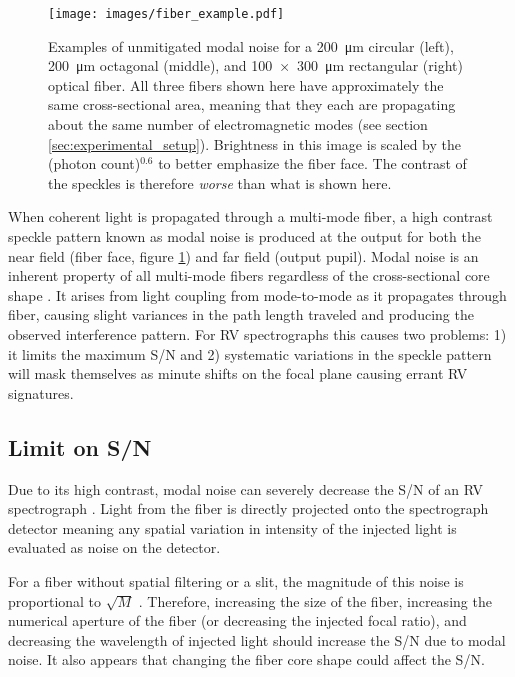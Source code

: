 \documentclass[twocolumn]{emulateapj}
\begin{document}
\begin{figure}
\centering
	\texttt{[image: images/fiber\_example.pdf]}
	\caption{Examples of unmitigated modal noise for a \SI{200}{\micro\meter} circular (left), \SI{200}{\micro\meter} octagonal (middle), and \SI{100x300}{\micro\meter} rectangular (right) optical fiber. All three fibers shown here have approximately the same cross-sectional area, meaning that they each are propagating about the same number of electromagnetic modes (see section \ref{sec:experimental_setup}). Brightness in this image is scaled by the (photon count)$^{0.6}$ to better emphasize the fiber face. The contrast of the speckles is therefore \textit{worse} than what is shown here.}
\label{fig:fiber_example}
\end{figure}

When coherent light is propagated through a multi-mode fiber, a high contrast speckle pattern known as modal noise is produced at the output for both the near field (fiber face, figure \ref{fig:fiber_example}) and far field (output pupil). Modal noise is an inherent property of all multi-mode fibers regardless of the cross-sectional core shape \citep{Sablowski2015}. It arises from light coupling from mode-to-mode as it propagates through fiber, causing slight variances in the path length traveled and producing the observed interference pattern. For RV spectrographs this causes two problems: 1) it limits the maximum S/N and 2) systematic variations in the speckle pattern will mask themselves as minute shifts on the focal plane causing errant RV signatures.

\subsection{Limit on S/N}

Due to its high contrast, modal noise can severely decrease the S/N of an RV spectrograph \citep{Epworth1978, Baudrand2001, Lemke2011}. Light from the fiber is directly projected onto the spectrograph detector meaning any spatial variation in intensity of the injected light is evaluated as noise on the detector.

For a fiber without spatial filtering or a slit, the magnitude of this noise is proportional to $\sqrt{M}$ \citep{Goodman1981}. Therefore, increasing the size of the fiber, increasing the numerical aperture of the fiber (or decreasing the injected focal ratio), and decreasing the wavelength of injected light should increase the S/N due to modal noise. It also appears that changing the fiber core shape could affect the S/N.
\end{document}
